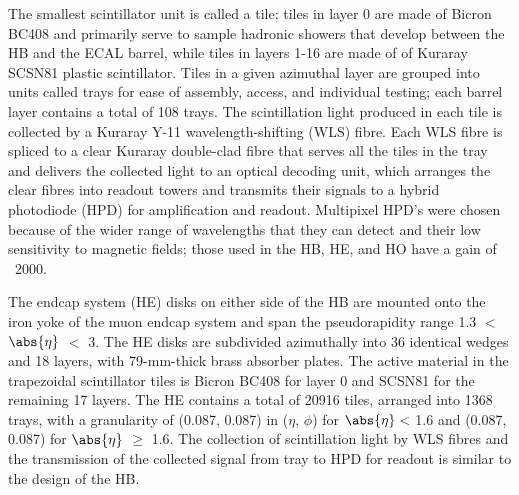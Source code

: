 The smallest scintillator unit is called a tile; tiles in layer 0 are made of Bicron BC408 and primarily serve to sample hadronic showers that develop between the HB and the ECAL barrel, while tiles in layers 1-16 are made of of Kuraray SCSN81 plastic scintillator. Tiles in a given azimuthal layer are grouped into units called trays for ease of assembly, access, and individual testing; each barrel layer contains a total of 108 trays. The scintillation light produced in each tile is collected by a Kuraray Y-11 wavelength-shifting (WLS) fibre. Each WLS fibre is spliced to a clear Kuraray double-clad fibre that serves all the tiles in the tray and delivers the collected light to an optical decoding unit, which arranges the clear fibres into readout towers and transmits their signals to a hybrid photodiode (HPD) for amplification and readout. Multipixel HPD's were chosen because of the wider range of wavelengths that they can detect and their low sensitivity to magnetic fields; those used in the HB, HE, and HO have a gain of ~2000.

The endcap system (HE) disks on either side of the HB are mounted onto the iron yoke of the muon endcap system and span the pseudorapidity range 1.3 $<$ $\abs{\eta}$ $<$ 3. The HE disks are subdivided azimuthally into 36 identical wedges and 18 layers, with 79-mm-thick brass absorber plates. The active material in the trapezoidal scintillator tiles is Bicron BC408 for layer 0 and SCSN81 for the remaining 17 layers. The HE contains a total of 20916 tiles, arranged into 1368 trays, with a granularity of (0.087, 0.087) in ($\eta$, $\phi$) for $\abs{\eta} <$ 1.6 and (0.087, 0.087) for $\abs{\eta}$ $\geq$ 1.6. The collection of scintillation light by WLS fibres and the transmission of the collected signal from tray to HPD for readout is similar to the design of the HB.


